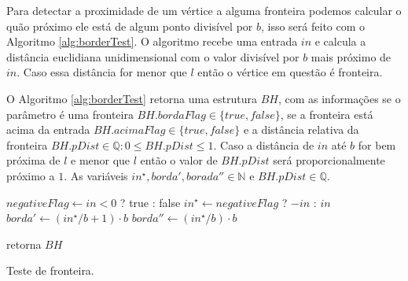 Para detectar a proximidade de um vértice a alguma fronteira podemos calcular o 
quão próximo ele está de algum ponto divisível por $b$, isso será feito com 
o Algoritmo \ref{alg:borderTest}. O algoritmo recebe uma entrada $in$ e calcula
a distância euclidiana unidimensional com o valor divisível por $b$ mais próximo 
de $in$. Caso essa distância for menor que $l$ então o vértice em questão é 
fronteira.

O Algoritmo \ref{alg:borderTest} retorna uma estrutura $BH$, com as informações
se o parâmetro é uma fronteira $BH.bordaFlag \in \{true, false\}$, se a fronteira 
está acima da entrada $BH.acimaFlag \in \{true, false\}$ e a distância relativa 
da fronteira $BH.pDist \in \mathbb{Q}: 0 \leq BH.pDist \leq 1$. Caso a distância de $in$ até $b$ for bem 
próxima de $l$ e menor que $l$ então o valor de $BH.pDist$ será proporcionalmente
próximo a $1$. As variáveis
$in^{\star}, borda', borada'' \in \mathbb{N}$ e $BH.pDist \in \mathbb{Q}$.

\begin{algorithm}[H]\label{alg:borderTest}%
    $negativeFlag \leftarrow in < 0$ ? true : false\;
    $in^{\star} \leftarrow negativeFlag$ ? $-in$ : $in$\;
    $borda' \leftarrow (in^{\star}/b +1) \cdot b$\;
    $borda'' \leftarrow (in^{\star}/b) \cdot b$\;
    
    retorna $BH$\;
    \caption{Teste de fronteira.}
\end{algorithm}

